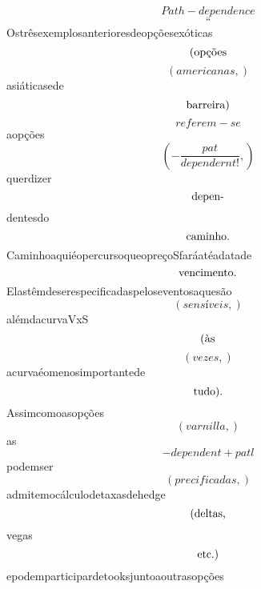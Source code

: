 \documentclass{article}
\begin{document}
\begin{equation}
Path - dependence
\end{equation}\begin{equation}
“
\end{equation}Ostrêsexemplosanterioresdeopçõesexóticas\begin{equation}
$(opções$
\end{equation}\begin{equation}
\left( americanas,\right)
\end{equation}asiáticasede\begin{equation}
$barreira)$
\end{equation}\begin{equation}
referem - se
\end{equation}aopções\begin{equation}
\left( - \frac{pat}{dependernt!},\right)
\end{equation}querdizer\begin{equation}
$depen-$
\end{equation}dentesdo\begin{equation}
$caminho.$
\end{equation}CaminhoaquiéopercursoqueopreçoSfaráatéadatade\begin{equation}
$vencimento.$
\end{equation}Elastêmdeserespecificadaspeloseventosaquesão\begin{equation}
\left( sensíveis,\right)
\end{equation}alémdacurvaVxS\begin{equation}
$(às$
\end{equation}\begin{equation}
\left( vezes,\right)
\end{equation}acurvaéomenosimportantede\begin{equation}
$tudo).$
\end{equation}Assimcomoasopções\begin{equation}
\left( varnilla,\right)
\end{equation}as\begin{equation}
- dependent + patl
\end{equation}podemser\begin{equation}
\left( precificadas,\right)
\end{equation}admitemocálculodetaxasdehedge\begin{equation}
$(deltas,$
\end{equation}vegas\begin{equation}
$etc.)$
\end{equation}epodemparticipardetooksjuntoaoutrasopções\begin{equation}

\end{equation}
\end{document}
